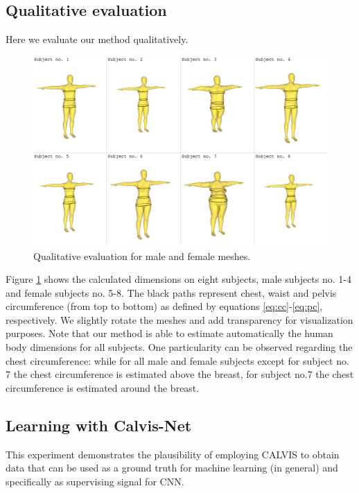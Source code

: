 \documentclass[runningheads, orivec]{llncs}
\begin{document}
\subsection{Qualitative evaluation}\label{subsec:qualitative_eval}
Here we evaluate our method qualitatively.
\begin{figure}[H]
	\begin{center}
		\includegraphics[width=\linewidth]{experiment_1_results.png}
	\end{center}
	\caption{Qualitative evaluation for male and female meshes.}
	\label{fig:qualitative_eval}
\end{figure}

Figure \ref{fig:qualitative_eval} shows the calculated dimensions on eight 
subjects, male subjects no. 1-4 and female subjects no. 5-8. The black paths 
represent chest, waist and pelvis circumference (from 
top to bottom) as defined by equations \ref{eq:cc}-\ref{eq:pc}, respectively. 
We slightly rotate the meshes and add transparency for visualization purposes. 
Note that our method is able to estimate automatically the human body 
dimensions for all 
subjects. One particularity can be observed regarding the chest circumference: 
while for all male and female subjects except for subject no. 7 the chest 
circumference is 
estimated above the breast, for subject no.7 the chest circumference is 
estimated around the breast.

\subsection{Learning with Calvis-Net}\label{subsec:learning}
This experiment demonstrates the plausibility of employing CALVIS to obtain 
data 
that can be used as a ground truth for machine learning (in general) and 
specifically as supervising signal for CNN.
\end{document}

